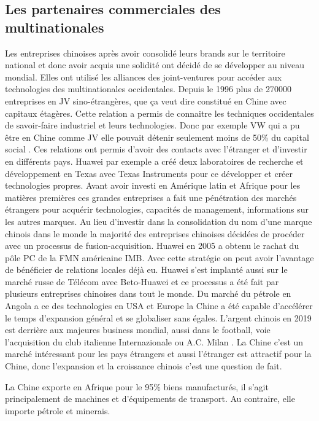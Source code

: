 \subsection{Les partenaires commerciales des multinationales}
Les entreprises chinoises après avoir consolidé leurs brands sur le territoire national et donc avoir acquis une solidité ont décidé de se développer au niveau mondial.
 Elles ont utilisé les alliances des joint-ventures pour accéder aux technologies des multinationales occidentales. Depuis le 1996 plus de 270000 entreprises en JV sino-étrangères, que ça veut dire constitué en Chine avec capitaux étagères. Cette relation a permis de connaitre les techniques occidentales de savoir-faire industriel et leurs technologies. Donc par exemple VW qui a pu être en Chine comme JV elle pouvait détenir seulement moins de 50\% du capital social .
Ces relations ont permis d’avoir des contacts avec l’étranger et d’investir en différents pays. Huawei par exemple a créé deux laboratoires de recherche et développement en Texas avec Texas Instruments pour ce développer et créer technologies propres.
Avant avoir investi en Amérique latin et Afrique pour les matières premières ces grandes entreprises a fait une pénétration des marchés étrangers pour acquérir technologies, capacités de management, informations sur les autres marques.  
Au lieu d’investir dans la consolidation du nom d’une marque chinois dans le monde la majorité des entreprises chinoises décidées de procéder avec un processus de fusion-acquisition. Huawei en 2005 a obtenu le rachat du pôle PC de la FMN américaine IMB. Avec cette stratégie on peut avoir l’avantage de bénéficier de relations locales déjà eu. Huawei s’est implanté aussi sur le marché russe de Télécom avec Beto-Huawei et ce processus a été fait par plusieurs entreprises chinoises dans tout le monde. 
Du marché du pétrole en Angola a ce des technologies en USA et Europe la Chine a été capable d’accélérer le temps d’expansion général et se globaliser sans égales. L’argent chinois en 2019 est derrière aux majeures business mondial, aussi dans le football, voie l’acquisition du club italienne Internazionale  ou A.C. Milan . La Chine c’est un marché intéressant pour les pays étrangers et aussi l’étranger est attractif pour la Chine, donc l’expansion et la croissance chinois c’est une question de fait.

La Chine exporte en Afrique pour le 95\% biens manufacturés, il s’agit principalement de machines et d’équipements de transport. Au contraire, elle importe pétrole et minerais.
